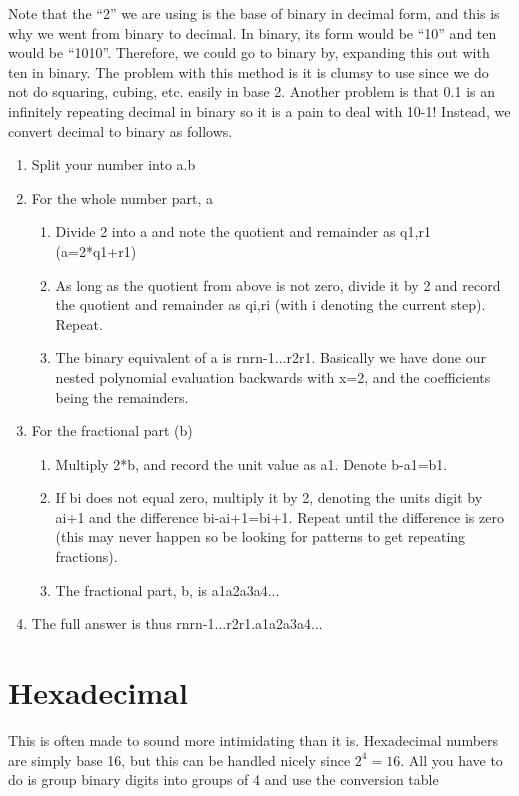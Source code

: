 Note that the ``2'' we are using is the base of binary in decimal form, and this is why we went from binary to decimal.  In binary, its form would be ``10'' and ten would be ``1010''. Therefore, we could go to binary by, expanding this out with ten in binary.  The problem with this method is it is clumsy to use since we do not do squaring, cubing, etc. easily in base 2.  Another problem is that 0.1 is an infinitely repeating decimal in binary so it is a pain to deal with 10-1!  Instead, we convert decimal to binary as follows.
\begin{enumerate}
\item Split your number into a.b
\item For the whole number part, a
  \begin{enumerate}
  \item Divide 2 into a and note the quotient and remainder as q1,r1 (a=2*q1+r1)
  \item As long as the quotient from above is not zero, divide it by 2 and
record the quotient and remainder as qi,ri (with i denoting the current
step).  Repeat.
  \item The binary equivalent of a is rnrn-1...r2r1.  Basically we have done
our nested polynomial evaluation backwards with x=2, and the coefficients
being the remainders.
  \end{enumerate}
\item For the fractional part (b)
  \begin{enumerate}
  \item Multiply 2*b, and record the unit value as a1.  Denote b-a1=b1.
  \item If bi does not equal zero, multiply it by 2, denoting the units digit
by ai+1 and the difference bi-ai+1=bi+1.  Repeat until the difference is
zero (this may never happen so be looking for patterns to get repeating
fractions).
  \item The fractional part, b, is a1a2a3a4...
\end{enumerate}
\item The full answer is thus rnrn-1...r2r1.a1a2a3a4...
\end{enumerate}

\section{Hexadecimal}
This is often made to sound more intimidating than it is.  Hexadecimal
numbers are simply base 16, but this can be handled nicely since $2^4=16$.
All you have to do is group binary digits into groups of 4 and use the
conversion table

